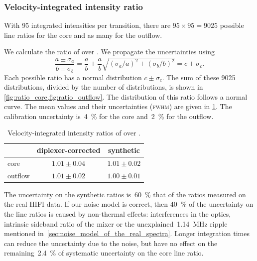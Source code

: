 \FloatBarrier
\subsubsection{Velocity-integrated intensity ratio}
\label{sec:line_ratios}
With 95 integrated intensities per transition, there are $95 \times 95 = 9025$ possible line ratios for the core and as many for the outflow.

We calculate the ratio of  over .
We propagate the uncertainties using
\begin{equation}
    \frac{a \pm \sigma_a}{b \pm \sigma_b}
    =
    \frac{a}{b} \pm \frac{a}{b}\sqrt{(\sigma_a / a)^2 + (\sigma_b / b)^2}
    = c \pm \sigma_c
    \text{.}
\end{equation}
Each possible ratio has a normal distribution $c \pm \sigma_c$.
The sum of these 9025 distributions, divided by the number of distributions, is shown in \cref{fig:ratio_core,fig:ratio_outflow}.
The distribution of this ratio follows a normal curve.
The mean values and their uncertainties (\textsc{fwhm}) are given in \cref{tab:line_ratios}.
The calibration uncertainty is~\SI{4}{\percent} for the core and~\SI{2}{\percent} for the outflow.

\begin{table}
    \centering
    \begin{tabular}{lcc}
        \toprule
                & diplexer-corrected   & synthetic \\
        \midrule
        core    & $1.01 \pm 0.04$ & $1.01 \pm 0.02$ \\
        outflow & $1.01 \pm 0.02$ & $1.00 \pm 0.01$ \\
        \bottomrule
    \end{tabular}
    \caption{
        Velocity-integrated intensity ratios of
         over .
    }
    \label{tab:line_ratios}
\end{table}

The uncertainty on the synthetic ratios is~\SI{60}{\percent} that of the ratios measured on the real HIFI data.
If our noise model is correct, then \SI{40}{\percent} of the uncertainty on the line ratios is caused by non-thermal effects: interferences in the optics, intrinsic sideband ratio of the mixer or the unexplained~\SI{1.14}{\mega\hertz} ripple mentioned in~\cref{sec:noise_model_of_the_real_spectra}.
Longer integration times can reduce the uncertainty due to the noise, but have no effect on the remaining~\SI{2.4}{\percent} of systematic uncertainty on the core line ratio.

